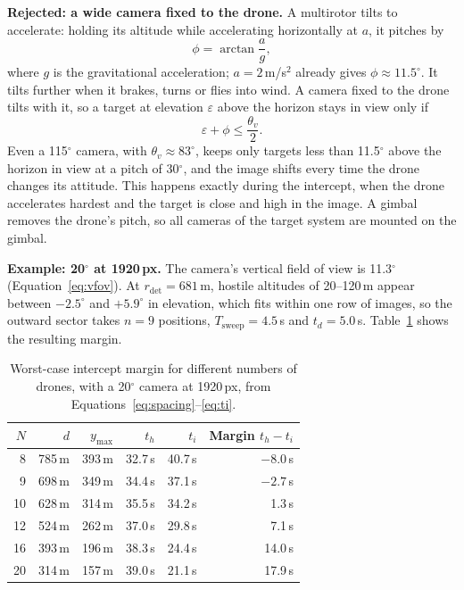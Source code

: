 \textbf{Rejected: a wide camera fixed to the drone.} A multirotor tilts to
accelerate: holding its altitude while accelerating horizontally at $a$, it
pitches by
\begin{equation}
  \phi = \arctan\frac{a}{g},
  \label{eq:tilt}
\end{equation}
where $g$ is the gravitational acceleration; $a = 2$\,m/s$^2$ already gives
$\phi \approx 11.5^\circ$. It tilts further when it brakes, turns or flies into wind. A camera fixed to the
drone tilts with it, so a target at elevation $\varepsilon$ above the horizon
stays in view only if
\begin{equation}
  \varepsilon + \phi \leq \frac{\theta_v}{2}.
  \label{eq:tiltview}
\end{equation}
Even a 115$^\circ$ camera, with $\theta_v \approx 83^\circ$, keeps only
targets less than 11.5$^\circ$ above the horizon in view at a pitch of
30$^\circ$, and the image shifts every time the drone changes its attitude.
This happens exactly during the intercept, when the drone accelerates hardest
and the target is close and high in the image. A gimbal removes the drone's
pitch, so all cameras of the target system are mounted on the gimbal.

\textbf{Example: 20$^\circ$ at 1920\,px.} The camera's vertical field of view
is 11.3$^\circ$ (Equation~\eqref{eq:vfov}). At $r_{\mathrm{det}} = 681$\,m,
hostile altitudes of 20--120\,m appear between $-2.5^\circ$ and $+5.9^\circ$
in elevation, which fits within one row of images, so the outward sector takes
$n = 9$ positions, $T_{\mathrm{sweep}} = 4.5$\,s and $t_d = 5.0$\,s.
Table~\ref{tab:feasibility} shows the resulting margin.

\begin{table}[H]
\centering
\small
\begin{tabular}{|r|r|r|r|r|r|}
\hline
$N$ & $d$ & $y_{\max}$ & $t_h$ & $t_i$ & Margin $t_h - t_i$ \\
\hline
8  & 785\,m & 393\,m & 32.7\,s & 40.7\,s & $-8.0$\,s \\
9  & 698\,m & 349\,m & 34.4\,s & 37.1\,s & $-2.7$\,s \\
10 & 628\,m & 314\,m & 35.5\,s & 34.2\,s & 1.3\,s \\
12 & 524\,m & 262\,m & 37.0\,s & 29.8\,s & 7.1\,s \\
16 & 393\,m & 196\,m & 38.3\,s & 24.4\,s & 14.0\,s \\
20 & 314\,m & 157\,m & 39.0\,s & 21.1\,s & 17.9\,s \\
\hline
\end{tabular}
\caption{Worst-case intercept margin for different numbers of drones, with a
20$^\circ$ camera at 1920\,px, from Equations~\eqref{eq:spacing}--\eqref{eq:ti}.}
\label{tab:feasibility}
\end{table}

